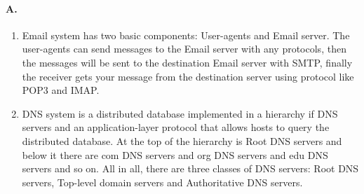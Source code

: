 \paragraph{A.}
\begin{enumerate}
	\item Email system has two basic components: User-agents and Email server. The user-agents can send messages to the Email server with any protocols, then the messages will be sent to the destination Email server with SMTP, finally the receiver gets your message from the destination server using protocol like POP3 and IMAP.
	
	\item DNS system is a distributed database implemented in a hierarchy if DNS servers and an application-layer protocol that allows hosts to query the distributed database. At the top of the hierarchy is Root DNS servers and below it there are com DNS servers and org DNS servers and edu DNS servers and so on. All in all, there are three classes of DNS servers: Root DNS servers, Top-level domain servers and Authoritative DNS servers.
\end{enumerate}